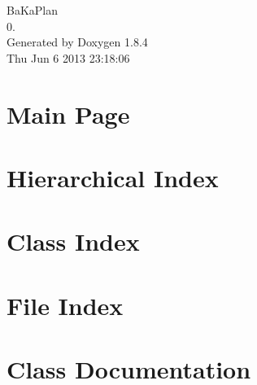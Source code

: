 \documentclass[twoside]{book}
\newcommand{\clearemptydoublepage}{%
  \newpage{\pagestyle{empty}\cleardoublepage}%
}
\begin{document}
\hypersetup{pageanchor=false}
\begin{titlepage}
\vspace*{7cm}
\begin{center}%
{\Large Ba\-Ka\-Plan \\[1ex]\large 0. }\\
\vspace*{1cm}
{\large Generated by Doxygen 1.8.4}\\
\vspace*{0.5cm}
{\small Thu Jun 6 2013 23:18:06}\\
\end{center}
\end{titlepage}
\clearemptydoublepage
\tableofcontents
\clearemptydoublepage
{}
\hypersetup{pageanchor=true}

\chapter{Main Page}
\label{index}\hypertarget{index}{}
\chapter{Hierarchical Index}

\chapter{Class Index}

\chapter{File Index}

\chapter{Class Documentation}
























\end{document}
